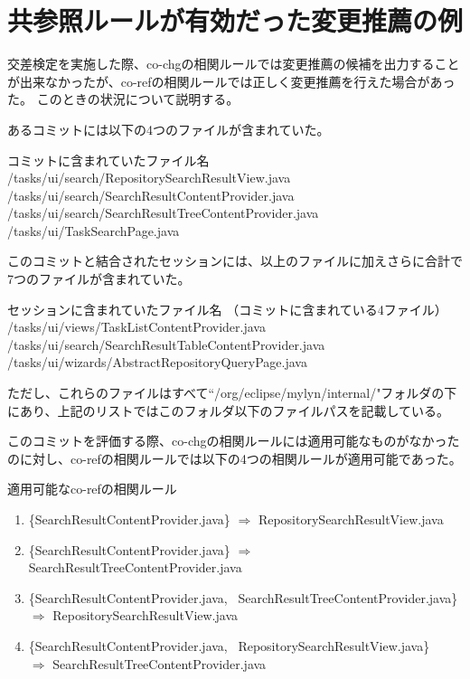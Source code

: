 \documentclass[a4paper]{jsbook}
\begin{document}
\section{共参照ルールが有効だった変更推薦の例}
交差検定を実施した際、co-chgの相関ルールでは変更推薦の候補を出力することが出来なかったが、co-refの相関ルールでは正しく変更推薦を行えた場合があった。
このときの状況について説明する。

あるコミットには以下の4つのファイルが含まれていた。
\begin{itembox}{コミットに含まれていたファイル名}
  /tasks/ui/search/RepositorySearchResultView.java \\
  /tasks/ui/search/SearchResultContentProvider.java \\
  /tasks/ui/search/SearchResultTreeContentProvider.java \\
  /tasks/ui/TaskSearchPage.java
\end{itembox}
このコミットと結合されたセッションには、以上のファイルに加えさらに合計で7つのファイルが含まれていた。
\begin{itembox}{セッションに含まれていたファイル名}
  （コミットに含まれている4ファイル）\\
  /tasks/ui/views/TaskListContentProvider.java \\
  /tasks/ui/search/SearchResultTableContentProvider.java\\
  /tasks/ui/wizards/AbstractRepositoryQueryPage.java
\end{itembox}
ただし、これらのファイルはすべて``/org/eclipse/mylyn/internal/"フォルダの下にあり、上記のリストではこのフォルダ以下のファイルパスを記載している。

このコミットを評価する際、co-chgの相関ルールには適用可能なものがなかったのに対し、co-refの相関ルールでは以下の4つの相関ルールが適用可能であった。
\begin{itembox}{適用可能なco-refの相関ルール}
  \begin{enumerate}
    \item  \{SearchResultContentProvider.java\} $\Rightarrow$ RepositorySearchResultView.java
    \item \{SearchResultContentProvider.java\} $\Rightarrow$ SearchResultTreeContentProvider.java
    \item \{SearchResultContentProvider.java, ~SearchResultTreeContentProvider.java\} 
      \\$\Rightarrow$ RepositorySearchResultView.java
    \item \{SearchResultContentProvider.java, ~RepositorySearchResultView.java\} \\
  $\Rightarrow$ SearchResultTreeContentProvider.java
  \end{enumerate}
\end{itembox}
\end{document}
